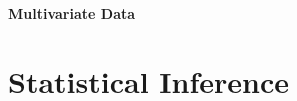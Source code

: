 \documentclass[12pt,a4paper]{report}
\begin{document}
\subsubsection{Multivariate Data}





\chapter{Statistical Inference} 




\newpage

\appendix





\newpage
{}


\label{sec:bibliography}
\end{document}
